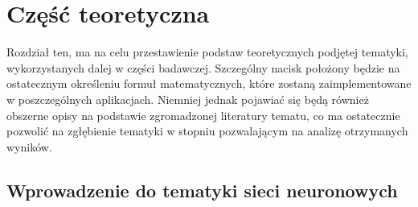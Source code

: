\chapter{Część teoretyczna}\label{chap:teoria}
\iffalse
Ten rozdział powinien zawierać całą istniejącą teorię z~której autor będzie korzystał w~dalszej części pracy.
\fi
Rozdział ten, ma na celu przestawienie podstaw teoretycznych podjętej tematyki, wykorzystanych dalej w części badawczej. Szczególny nacisk położony będzie na ostatecznym określeniu formuł matematycznych, które zostaną zaimplementowane w poszczególnych aplikacjach. Niemniej jednak pojawiać się będą również obszerne opisy na podstawie zgromadzonej literatury tematu, co ma ostatecznie pozwolić na zgłębienie tematyki w stopniu pozwalającym na analizę otrzymanych wyników.

\section{Wprowadzenie do tematyki sieci neuronowych} \label{sec:sieci}

